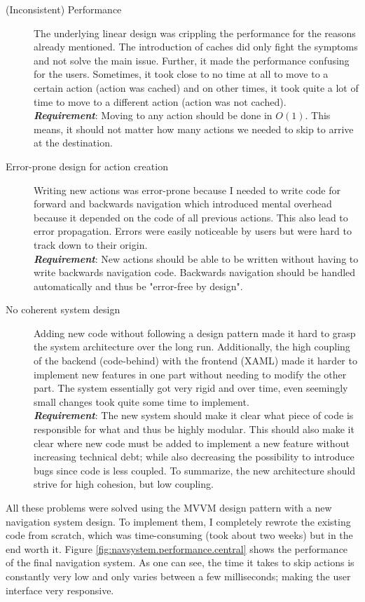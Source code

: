 \begin{description}
\item [(Inconsistent) Performance] The underlying linear design was crippling the performance for the reasons already mentioned. The introduction of caches did only fight the symptoms and not solve the main issue. Further, it made the performance confusing for the users. Sometimes, it took close to no time at all to move to a certain action (action was cached) and on other times, it took quite a lot of time to move to a different action (action was not cached). \\
\textit{\textbf{Requirement}}: Moving to any action should be done in $O(1)$. This means, it should not matter how many actions we needed to skip to arrive at the destination.
\item [Error-prone design for action creation] Writing new actions was error-prone because I needed to write code for forward and backwards navigation which introduced mental overhead because it depended on the code of all previous actions. This also lead to error propagation. Errors were easily noticeable by users but were hard to track down to their origin.\\
\textit{\textbf{Requirement}}: New actions should be able to be written without having to write backwards navigation code. Backwards navigation should be handled automatically and thus be "error-free by design".
\item [No coherent system design] Adding new code without following a design pattern made it hard to grasp the system architecture over the long run. Additionally, the high coupling of the backend (code-behind) with the frontend (XAML) made it harder to implement new features in one part without needing to modify the other part. The system essentially got very rigid and over time, even seemingly small changes took quite some time to implement.\\
\textit{\textbf{Requirement}}: The new system should make it clear what piece of code is responsible for what and thus be highly modular. This should also make it clear where new code must be added to implement a new feature without increasing technical debt; while also decreasing the possibility to introduce bugs since code is less coupled. To summarize, the new architecture should strive for high cohesion, but low coupling.
\end{description}

All these problems were solved using the MVVM design pattern with a new navigation system design. To implement them, I completely rewrote the existing code from scratch, which was time-consuming (took about two weeks) but in the end worth it. Figure \ref{fig:navsystem.performance.central} shows the performance of the final navigation system. As one can see, the time it takes to skip actions is constantly very low and only varies between a few milliseconds; making the user interface very responsive.

